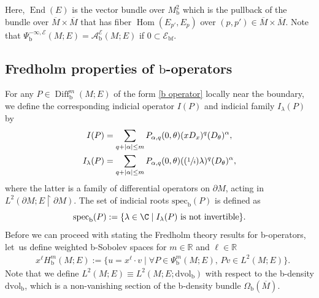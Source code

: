 \documentclass[JEP,XML,SOM,Unicode,NoFloatCountersInSection,published]{cedram}
\newcommand{\Psfrac}[2]{(\sfrac{#1}{#2})}
\theoremstyle{plain}
\theoremstyle{definition}
\newcommand\calA{{\mathcal A}}
\newcommand\calE{{\mathcal E}}
\newcommand{\bb}{{\mathrm{b}}}
\newcommand{\bbf}{{\mathrm{bf}}}
\newcommand{\dvol}{\mathrm{dvol}}
\newcommand{\specb}{\mathrm{spec}_\bb}
\DeclareMathOperator{\Diff}{Diff}
\DeclareMathOperator{\End}{End}
\DeclareMathOperator{\Hom}{Hom}
\newcommand{\dM}{{\partial M}}
\newcommand{\Mbar}{{\overline{M}}}\let\M\Mbar
\begin{document}
Here, $\End(E)$ is the vector bundle over $M^2_\bb$ which is the pullback of the bundle over $\Mbar\times\Mbar$ that has fiber $\Hom(E_{p'},E_p)$ over $(p,p')\in
\Mbar\times\Mbar$.
Note that $\Psi^{-\infty,\calE}_\bb(M;E) = \calA_\bb^\calE(M;E)$ if $0\subset\calE_\bbf$.

\subsection{Fredholm properties of \texorpdfstring{$\bb$}{b}-operators}\label{subsection-I}
For any $P \in \Diff^{m}_\bb(M; E)$ of the form \eqref{b operator} locally near the
boundary, we define the corresponding indicial operator $I(P)$ and indicial family $I_\lambda(P)$ by
\begin{align*}
I(P) &= \sum_{q+ \vert \alpha\vert \leq m} P_{\alpha, q}(0,\theta) (xD_x)^q (D_{\theta})^{\alpha}, \\
I_\lambda (P) &= \sum_{q+ \vert \alpha\vert \leq m} P_{\alpha, q}(0,\theta)(\Psfrac1i\lambda)^{q}(D_{\theta})^{\alpha},
\end{align*}
where the latter is a family of differential operators on $\dM$, acting in $L^2(\dM;E\restriction \dM)$. The set of indicial roots
$\specb(P)$ is defined as
\[
\specb(P):= \{\lambda \in \C \mid I_{\lambda}(P) \ \text{is not invertible}\}.
\]
Before we can proceed with stating the Fredholm theory results for b-operators,
let~us define weighted b-Sobolev spaces for $m \in \mathbb{R}$ and $\ell \in \mathbb{R}$
\begin{align*}
&x^{\ell}H^{m}_\bb(M;E) := \{ u = x^{\ell} \cdot v
\mid \forall P \in
\Psi^{m}_\bb(M;E),\,P v \in L^{2}(M;E)\}.
\end{align*}
Note that we define $L^2(M;E) \equiv L^2(M; E; \dvol_\bb)$ with respect to the b-density $\dvol_\bb$,
which is a non-vanishing section of the b-density bundle $\Omega_\bb(\Mbar)$.
\end{document}

